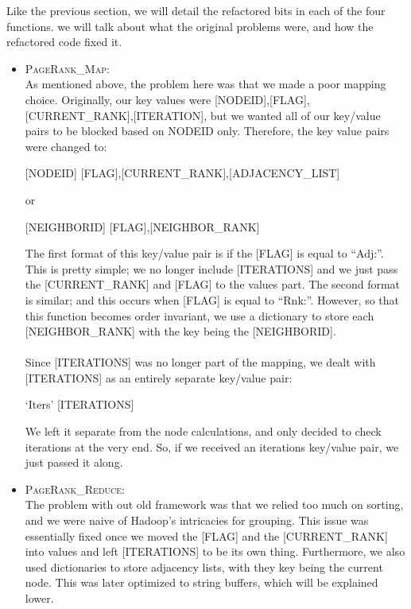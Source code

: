 Like the previous section, we will detail the refactored bits in each of the four functions. we will talk about what the original problems were, and how the refactored code fixed it.
\begin{itemize}
  \item \textsc{PageRank\_Map}: \\
    As mentioned above, the problem here was that we made a poor mapping choice. Originally, our key values were [NODEID],[FLAG],[CURRENT\_RANK],[ITERATION], but we wanted all of our key/value pairs to be blocked based on NODEID only. Therefore, the key value pairs were changed to:
    \begin{center}
      [NODEID] \hspace{8mm} [FLAG],[CURRENT\_RANK],[ADJACENCY\_LIST]
    \end{center}
    or
    \begin{center}
      [NEIGHBORID] \hspace{8mm} [FLAG],[NEIGHBOR\_RANK]
    \end{center}
    The first format of this key/value pair is if the [FLAG] is equal to ``Adj:''. This is pretty simple; we no longer include [ITERATIONS] and we just pass the [CURRENT\_RANK] and [FLAG] to the values part. The second format is similar; and this occurs when [FLAG] is equal to ``Rnk:''. However, so that this function becomes order invariant, we use a dictionary to store each [NEIGHBOR\_RANK] with the key being the [NEIGHBORID].
    \\ \\
    Since [ITERATIONS] was no longer part of the mapping, we dealt with [ITERATIONS] as an entirely separate key/value pair: 
    \begin{center}
      `Iters' \hspace{8mm} [ITERATIONS]
    \end{center} 
    We left it separate from the node calculations, and only decided to check iterations at the very end. So, if we received an iterations key/value pair, we just passed it along.
  \item \textsc{PageRank\_Reduce}: \\
    The problem with out old framework was that we relied too much on sorting, and we were naive of Hadoop's intricacies for grouping. This issue was essentially fixed once we moved the [FLAG] and the [CURRENT\_RANK] into values and left [ITERATIONS] to be its own thing. Furthermore, we also used dictionaries to store adjacency lists, with they key being the current node. This was later optimized to string buffers, which will be explained lower.

\end{itemize}
